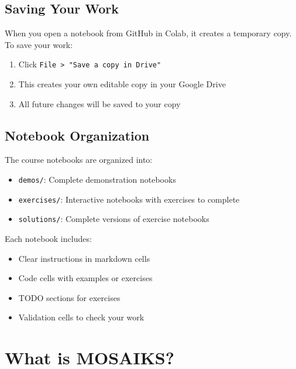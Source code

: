 \documentclass[
  letterpaper,
  DIV=11,
  numbers=noendperiod]{scrreprt}
\providecommand{\tightlist}{%
  \setlength{\itemsep}{0pt}\setlength{\parskip}{0pt}}\usepackage{longtable,booktabs,array}
\begin{document}
\hypertarget{saving-your-work}{%
\section{Saving Your Work}\label{saving-your-work}}

When you open a notebook from GitHub in Colab, it creates a temporary
copy. To save your work:

\begin{enumerate}
\def\labelenumi{\arabic{enumi}.}
\tightlist
\item
  Click \texttt{File\ \textgreater{}\ "Save\ a\ copy\ in\ Drive"}
\item
  This creates your own editable copy in your Google Drive
\item
  All future changes will be saved to your copy
\end{enumerate}

\hypertarget{notebook-organization}{%
\section{Notebook Organization}\label{notebook-organization}}

The course notebooks are organized into:

\begin{itemize}
\tightlist
\item
  \texttt{demos/}: Complete demonstration notebooks
\item
  \texttt{exercises/}: Interactive notebooks with exercises to complete
\item
  \texttt{solutions/}: Complete versions of exercise notebooks
\end{itemize}

Each notebook includes:

\begin{itemize}
\tightlist
\item
  Clear instructions in markdown cells
\item
  Code cells with examples or exercises
\item
  TODO sections for exercises
\item
  Validation cells to check your work
\end{itemize}

\hypertarget{what-is-mosaiks}{%
\chapter{What is MOSAIKS?}\label{what-is-mosaiks}}
\end{document}
